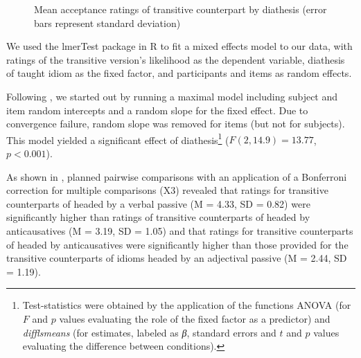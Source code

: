\documentclass[output=paper]{langsci/langscibook}
\begin{document}
\begin{figure}
    \caption{Mean acceptance ratings of transitive counterpart by diathesis
    (error bars represent standard deviation)}\label{fig:20.2}
    

\end{figure}

We used the lmerTest package in R \parencite{Kuzetal2015} to fit a mixed
effects model to our data, with ratings of the transitive version’s likelihood
as the dependent variable, diathesis of taught idiom as the fixed factor, and
participants and items as random effects.

Following \citet{Barretal2013}, we started out by running a maximal model
including subject and item random intercepts and a random slope for the fixed
effect. Due to convergence failure, random slope was removed for items (but not
for subjects). This model yielded a significant effect of
diathesis\footnote{Test-statistics were obtained by the application of the
    functions ANOVA (for $F$ and $p$ values evaluating the role of the fixed
    factor as a predictor) and \emph{difflsmeans} (for estimates, labeled as
\emph{β}, standard errors and $t$ and $p$ values evaluating the
difference between conditions).} ($F(2,14.9) = 13.77$, $p < 0.001$).

As shown in , planned pairwise comparisons with an
application of a Bonferroni correction for multiple comparisons (X3) revealed
that ratings for transitive counterparts of  headed by a verbal passive
(M = 4.33, SD = 0.82) were significantly higher than ratings of transitive
counterparts of  headed by anticausatives (M = 3.19, SD = 1.05) and that
ratings for transitive counterparts of  headed by anticausatives were
significantly higher than those provided for the transitive counterparts of
idioms headed by an adjectival passive  (M = 2.44, SD = 1.19).
\end{document}
